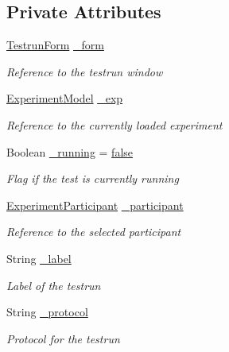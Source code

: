 \subsection*{Private Attributes}
\begin{DoxyCompactItemize}
\item 
\hyperlink{class_web_analyzer_1_1_u_i_1_1_testrun_form}{Testrun\+Form} \hyperlink{class_web_analyzer_1_1_u_i_1_1_interaction_objects_1_1_testrun_control_add6c2a6d01609147fdd302fece571636}{\+\_\+form}
\begin{DoxyCompactList}\small\item\em Reference to the testrun window \end{DoxyCompactList}\item 
\hyperlink{class_web_analyzer_1_1_models_1_1_base_1_1_experiment_model}{Experiment\+Model} \hyperlink{class_web_analyzer_1_1_u_i_1_1_interaction_objects_1_1_testrun_control_a9c232cac904a9ae80233456406563e03}{\+\_\+exp}
\begin{DoxyCompactList}\small\item\em Reference to the currently loaded experiment \end{DoxyCompactList}\item 
Boolean \hyperlink{class_web_analyzer_1_1_u_i_1_1_interaction_objects_1_1_testrun_control_a476e0340bbef94992b2a976db6f37d25}{\+\_\+running} = \hyperlink{_u_i_2_h_t_m_l_resources_2js_2src_2export_8js_ae6c865df784842196d411c1466b01686}{false}
\begin{DoxyCompactList}\small\item\em Flag if the test is currently running \end{DoxyCompactList}\item 
\hyperlink{class_web_analyzer_1_1_models_1_1_base_1_1_experiment_participant}{Experiment\+Participant} \hyperlink{class_web_analyzer_1_1_u_i_1_1_interaction_objects_1_1_testrun_control_a6f2545f1b64a0d78e4584e5482dbd8b2}{\+\_\+participant}
\begin{DoxyCompactList}\small\item\em Reference to the selected participant \end{DoxyCompactList}\item 
String \hyperlink{class_web_analyzer_1_1_u_i_1_1_interaction_objects_1_1_testrun_control_a68cf522d277fa8003eb8f0e59d237101}{\+\_\+label}
\begin{DoxyCompactList}\small\item\em Label of the testrun \end{DoxyCompactList}\item 
String \hyperlink{class_web_analyzer_1_1_u_i_1_1_interaction_objects_1_1_testrun_control_afe133f8d5d0ccc48edb3790d044b0537}{\+\_\+protocol}
\begin{DoxyCompactList}\small\item\em Protocol for the testrun \end{DoxyCompactList}\end{DoxyCompactItemize}


